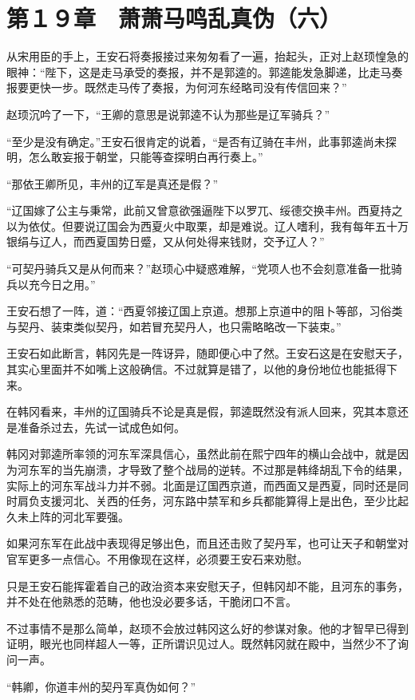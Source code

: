 \section{第１９章　萧萧马鸣乱真伪（六）}

从宋用臣的手上，王安石将奏报接过来匆匆看了一遍，抬起头，正对上赵顼惶急的眼神：“陛下，这是走马承受的奏报，并不是郭逵的。郭逵能发急脚递，比走马奏报要更快一步。既然走马传了奏报，为何河东经略司没有传信回来？”

赵顼沉吟了一下，“王卿的意思是说郭逵不认为那些是辽军骑兵？”

“至少是没有确定。”王安石很肯定的说着，“是否有辽骑在丰州，此事郭逵尚未探明，怎么敢妄报于朝堂，只能等查探明白再行奏上。”

“那依王卿所见，丰州的辽军是真还是假？”

“辽国嫁了公主与秉常，此前又曾意欲强逼陛下以罗兀、绥德交换丰州。西夏持之以为依仗。但要说辽国会为西夏火中取栗，却是难说。辽人嗜利，我有每年五十万银绢与辽人，而西夏国势日蹙，又从何处得来钱财，交予辽人？”

“可契丹骑兵又是从何而来？”赵顼心中疑惑难解，“党项人也不会刻意准备一批骑兵以充今日之用。”

王安石想了一阵，道：“西夏邻接辽国上京道。想那上京道中的阻卜等部，习俗类与契丹、装束类似契丹，如若冒充契丹人，也只需略略改一下装束。”

王安石如此断言，韩冈先是一阵讶异，随即便心中了然。王安石这是在安慰天子，其实心里面并不如嘴上这般确信。不过就算是错了，以他的身份地位也能抵得下来。

在韩冈看来，丰州的辽国骑兵不论是真是假，郭逵既然没有派人回来，究其本意还是准备杀过去，先试一试成色如何。

韩冈对郭逵所率领的河东军深具信心，虽然此前在熙宁四年的横山会战中，就是因为河东军的当先崩溃，才导致了整个战局的逆转。不过那是韩绛胡乱下令的结果，实际上的河东军战斗力并不弱。北面是辽国西京道，而西面又是西夏，同时还是同时肩负支援河北、关西的任务，河东路中禁军和乡兵都能算得上是出色，至少比起久未上阵的河北军要强。

如果河东军在此战中表现得足够出色，而且还击败了契丹军，也可让天子和朝堂对官军更多一点信心。不用像现在这样，必须要王安石来劝慰。

只是王安石能挥霍着自己的政治资本来安慰天子，但韩冈却不能，且河东的事务，并不处在他熟悉的范畴，他也没必要多话，干脆闭口不言。

不过事情不是那么简单，赵顼不会放过韩冈这么好的参谋对象。他的才智早已得到证明，眼光也同样超人一等，正所谓识见过人。既然韩冈就在殿中，当然少不了询问一声。

“韩卿，你道丰州的契丹军真伪如何？”

